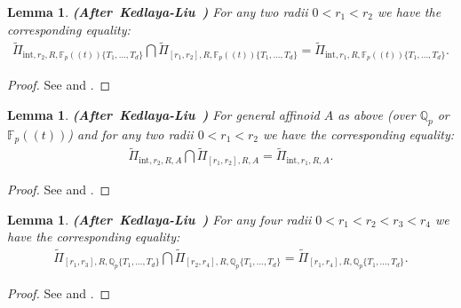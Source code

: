 \documentclass[12pt]{amsart}
\newtheorem{lemma}[theorem]{Lemma}
\theoremstyle{definition}
\numberwithin{equation}{section}
\begin{document}
\begin{lemma} \mbox{\bf{(After Kedlaya-Liu \cite[Lemma 5.2.6]{KL2})}}
For any two radii $0<r_1<r_2$ we have the corresponding equality:
\begin{align}
\widetilde{\Pi}_{\mathrm{int},r_2,R,\mathbb{F}_p((t))\{T_1,...,T_d\}}\bigcap \widetilde{\Pi}_{[r_1,r_2],R,\mathbb{F}_p((t))\{T_1,...,T_d\}}	=\widetilde{\Pi}_{\mathrm{int},r_1,R,\mathbb{F}_p((t))\{T_1,...,T_d\}}.
\end{align}

\end{lemma}


\begin{proof}
See \cite[Lemma 5.2.6]{KL2} and \cite[Proposition 2.13]{XT2}.	
\end{proof}


\begin{lemma} \mbox{\bf{(After Kedlaya-Liu \cite[Lemma 5.2.6]{KL2})}}
For general affinoid $A$ as above (over $\mathbb{Q}_p$ or $\mathbb{F}_p((t))$) and for any two radii $0<r_1<r_2$ we have the corresponding equality:
\begin{align}
\widetilde{\Pi}_{\mathrm{int},r_2,R,A}\bigcap \widetilde{\Pi}_{[r_1,r_2],R,A}	=\widetilde{\Pi}_{\mathrm{int},r_1,R,A}.
\end{align}

\end{lemma}


\begin{proof}
See \cite[Lemma 5.2.6]{KL2} and \cite[Proposition 2.14]{XT2}.	
\end{proof}



\begin{lemma} \mbox{\bf{(After Kedlaya-Liu \cite[Lemma 5.2.10]{KL2})}}
For any four radii $0<r_1<r_2<r_3<r_4$ we have the corresponding equality:
\begin{align}
\widetilde{\Pi}_{[r_1,r_3],R,\mathbb{Q}_p\{T_1,...,T_d\}}\bigcap \widetilde{\Pi}_{[r_2,r_4],R,\mathbb{Q}_p\{T_1,...,T_d\}}	=\widetilde{\Pi}_{[r_1,r_4],R,\mathbb{Q}_p\{T_1,...,T_d\}}.
\end{align}

\end{lemma}


\begin{proof}
See \cite[Lemma 5.2.10]{KL2} and \cite[Proposition 2.16]{XT2}.	
\end{proof}
\end{document}

